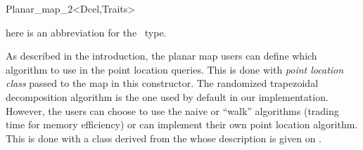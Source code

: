 \begin{ccRefClass}{Planar_map_2<Dcel,Traits>}
    
     here is an abbreviation for the \ccRefName\ type.

        



\begin{ccAdvanced}


As described in the introduction, the planar map users can define which algorithm to use in the point location queries. 
This is done with {\em point location class} passed to the map in this constructor. The randomized trapezoidal decomposition algorithm is the one used by default in our implementation.
However, the users can choose to use the naive or ``walk'' algorithms
(trading time
for memory efficiency) or can implement their own point location algorithm.
This is done with a class derived from the 
 whose description is given on
.

  



\end{ccAdvanced}
\end{ccRefClass}
